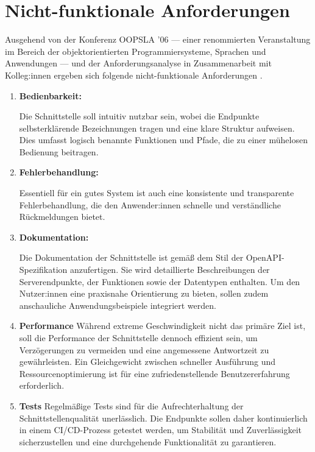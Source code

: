 \documentclass[draft,final]{vutinfth} %
\begin{document}
\section{Nicht-funktionale Anforderungen}

Ausgehend von der Konferenz OOPSLA '06 --- einer renommierten Veranstaltung im Bereich der objektorientierten Programmiersysteme, Sprachen und Anwendungen --- und der Anforderungsanalyse in Zusammenarbeit mit Kolleg:innen ergeben sich folgende nicht-funktionale Anforderungen \cite{Bloch:2006:How2DesignGoodAPI}.

\begin{enumerate}
	
	\item \textbf{Bedienbarkeit:}
	
	Die Schnittstelle soll intuitiv nutzbar sein, wobei die Endpunkte selbsterklärende Bezeichnungen tragen und eine klare Struktur aufweisen. 
	Dies umfasst logisch benannte Funktionen und Pfade, die zu einer mühelosen Bedienung beitragen.
	
	\item \textbf{Fehlerbehandlung:}
 
	Essentiell für ein gutes System ist auch eine konsistente und transparente Fehlerbehandlung, die den Anwender:innen schnelle und verständliche Rückmeldungen bietet.
	
	\item \textbf{Dokumentation:}
	
	Die Dokumentation der Schnittstelle ist gemäß dem Stil der OpenAPI-Spezifikation anzufertigen. Sie wird detaillierte Beschreibungen der Serverendpunkte, der Funktionen sowie der Datentypen enthalten. 
	Um den Nutzer:innen eine praxisnahe Orientierung zu bieten, sollen zudem anschauliche Anwendungsbeispiele integriert werden.
	
	\item \textbf{Performance}
	Während extreme Geschwindigkeit nicht das primäre Ziel ist, soll die Performance der Schnittstelle dennoch effizient sein, um Verzögerungen zu vermeiden und eine angemessene Antwortzeit zu gewährleisten. 
	Ein Gleichgewicht zwischen schneller Ausführung und Ressourcenoptimierung ist für eine zufriedenstellende Benutzererfahrung erforderlich.
	
	\item \textbf{Tests}
	Regelmäßige Tests sind für die Aufrechterhaltung der Schnittstellenqualität unerlässlich. 
	Die Endpunkte sollen daher kontinuierlich in einem CI/CD-Prozess getestet werden, um Stabilität und Zuverlässigkeit sicherzustellen und eine durchgehende Funktionalität zu garantieren.
	
\end{enumerate}
\end{document}
